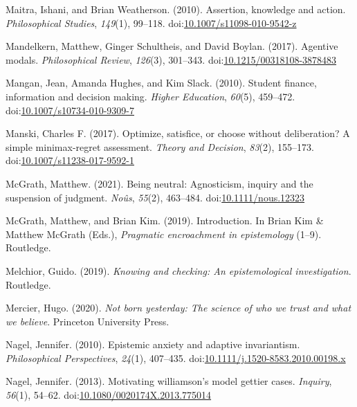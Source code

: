 \documentclass[
  10pt,
  letterpaper,
  twoside]{scrbook}
\newlength{\cslhangindent}
\newenvironment{CSLReferences}[2] %
 {\begin{list}{}{%
  \setlength{\itemindent}{0pt}
  \setlength{\leftmargin}{0pt}
  \setlength{\parsep}{0pt}
  \ifodd #1
   \setlength{\leftmargin}{\cslhangindent}
   \setlength{\itemindent}{-1\cslhangindent}
  \fi
  \setlength{\itemsep}{#2\baselineskip}}}
 {\end{list}}
\begin{document}
\begin{CSLReferences}{1}{0}
Maitra, Ishani, and Brian Weatherson. (2010). Assertion, knowledge and
action. \emph{Philosophical Studies}, \emph{149}(1), 99--118.
doi:\href{https://doi.org/10.1007/s11098-010-9542-z}{10.1007/s11098-010-9542-z}

Mandelkern, Matthew, Ginger Schultheis, and David Boylan. (2017).
Agentive modals. \emph{Philosophical Review}, \emph{126}(3), 301--343.
doi:\href{https://doi.org/10.1215/00318108-3878483}{10.1215/00318108-3878483}

Mangan, Jean, Amanda Hughes, and Kim Slack. (2010). Student finance,
information and decision making. \emph{Higher Education}, \emph{60}(5),
459--472.
doi:\href{https://doi.org/10.1007/s10734-010-9309-7}{10.1007/s10734-010-9309-7}

Manski, Charles F. (2017). Optimize, satisfice, or choose without
deliberation? A simple minimax-regret assessment. \emph{Theory and
Decision}, \emph{83}(2), 155--173.
doi:\href{https://doi.org/10.1007/s11238-017-9592-1}{10.1007/s11238-017-9592-1}

McGrath, Matthew. (2021). Being neutral: Agnosticism, inquiry and the
suspension of judgment. \emph{No{û}s}, \emph{55}(2), 463--484.
doi:\href{https://doi.org/10.1111/nous.12323}{10.1111/nous.12323}

McGrath, Matthew, and Brian Kim. (2019). Introduction. In Brian Kim \&
Matthew McGrath (Eds.), \emph{Pragmatic encroachment in epistemology}
(1--9). Routledge.

Melchior, Guido. (2019). \emph{Knowing and checking: An epistemological
investigation}. Routledge.

Mercier, Hugo. (2020). \emph{Not born yesterday: The science of who we
trust and what we believe}. Princeton University Press.

Nagel, Jennifer. (2010). Epistemic anxiety and adaptive invariantism.
\emph{Philosophical Perspectives}, \emph{24}(1), 407--435.
doi:\href{https://doi.org/10.1111/j.1520-8583.2010.00198.x}{10.1111/j.1520-8583.2010.00198.x}

Nagel, Jennifer. (2013). Motivating williamson's model gettier cases.
\emph{Inquiry}, \emph{56}(1), 54--62.
doi:\href{https://doi.org/10.1080/0020174X.2013.775014}{10.1080/0020174X.2013.775014}


\end{CSLReferences}
\end{document}
